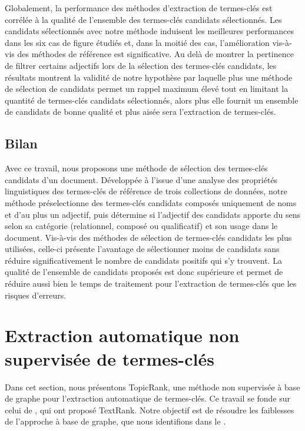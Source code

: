         Globalement, la performance des méthodes d'extraction de termes-clés est
        corrélée à la qualité de l'ensemble des termes-clés candidats
        sélectionnés. Les candidats sélectionnés avec notre méthode induisent
        les meilleures performances dans les six cas de figure étudiés et, dans
        la moitié des cas, l'amélioration vis-à-vis des méthodes de référence
        est significative. Au delà de montrer la pertinence de filtrer certains
        adjectifs lors de la sélection des termes-clés candidats, les résultats
        montrent la validité de notre hypothèse par laquelle plus une méthode de
        sélection de candidats permet un rappel maximum élevé tout en limitant
        la quantité de termes-clés candidats sélectionnés, alors plus
        elle fournit un ensemble de candidats de bonne qualité et plus aisée
        sera l'extraction de termes-clés.

    \subsection{Bilan}
    \label{subsec:main-automatic_keyphrase_annotation-keyphrase_candidate_selection-conclusion}
      Avec ce travail, nous proposons une méthode de sélection des termes-clés
      candidats d'un document. Développée à l'issue d'une analyse des propriétés
      linguistiques des termes-clés de référence de trois collections de
      données, notre méthode préselectionne des termes-clés candidats composés
      uniquement de noms et d'au plus un adjectif, puis détermine si l'adjectif
      des candidats apporte du sens selon sa catégorie (relationnel, composé ou
      qualificatif) et son usage dans le document. Vis-à-vis des méthodes de
      sélection de termes-clés candidats les plus utilisées, celle-ci présente
      l'avantage de sélectionner moins de candidats sans réduire
      significativement le nombre de candidats positifs qui s'y trouvent. La
      qualité de l'ensemble de candidats proposés est donc supérieure et permet
      de réduire aussi bien le temps de traitement pour l'extraction de
      termes-clés que les risques d'erreurs.


  \section{Extraction automatique non supervisée de termes-clés}
  \label{sec:main-automatic_keyphrase_annotation-unsupervised_automatic_keyphrase_extraction}
    Dans cet section, nous présentons TopicRank, une méthode non supervisée à
    base de graphe pour l'extraction automatique de termes-clés. Ce travail se
    fonde sur celui de , qui ont proposé TextRank.
    Notre objectif est de résoudre les faiblesses de l'approche à base de
    graphe, que nous identifions dans le
    .

